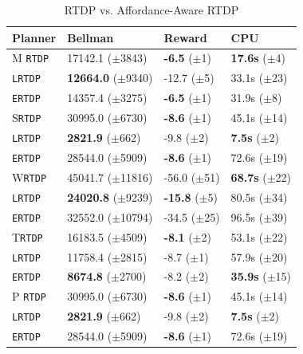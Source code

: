 \documentclass[letterpaper]{article}
\newcommand{\ra}[1]{\renewcommand{\arraystretch}{#1}} %
\begin{document}
\begin{table}
\ra{1.4}
\begin{tabular}{@{}llll@{}}\toprule
Planner & Bellman & Reward & CPU \\ \midrule
M \texttt{RTDP} & 17142.1 ($\pm$3843) 		& {\bf -6.5} ($\pm$1) 		& {\bf 17.6s}   ($\pm$4) \\
\texttt{LRTDP} 	& {\bf 12664.0} ($\pm$9340) 	& -12.7 ($\pm$5) 		& 33.1s   ($\pm$23) \\
\texttt{ERTDP} 	& 14357.4 ($\pm$3275) 		& {\bf -6.5}   ($\pm$1) 	& 31.9s   ($\pm$8) \\ \hline
S\texttt{RTDP} 	& 30995.0 ($\pm$6730) 		& {\bf -8.6}   ($\pm$1) 	& 45.1s   ($\pm$14) \\
\texttt{LRTDP} 	& {\bf 2821.9} 	 ($\pm$662) 	& -9.8   ($\pm$2) 		& {\bf 7.5s}  ($\pm$2) \\
\texttt{ERTDP} 	& 28544.0 ($\pm$5909) 		& {\bf -8.6}   ($\pm$1) 	& 72.6s   ($\pm$19) \\ \hline
W\texttt{RTDP} & 45041.7 ($\pm$11816) 		& -56.0   ($\pm$51) 		& {\bf 68.7s}   ($\pm$22) \\
\texttt{LRTDP} 	& {\bf 24020.8} ($\pm$9239) 	& {\bf -15.8}   ($\pm$5) 	& 80.5s   ($\pm$34) \\
\texttt{ERTDP} 	& 32552.0 ($\pm$10794) 		& -34.5   ($\pm$25) 		& 96.5s   ($\pm$39) \\ \hline
T\texttt{RTDP}  	& 16183.5 ($\pm$4509) 		& {\bf -8.1}   ($\pm$2) 	& 53.1s   ($\pm$22) \\
\texttt{LRTDP} 	& 11758.4 ($\pm$2815) 		& -8.7   ($\pm$1) 		& 57.9s   ($\pm$20) \\
\texttt{ERTDP} 	& {\bf 8674.8} 	($\pm$2700) 	& -8.2   ($\pm$2) 		& {\bf 35.9s}   ($\pm$15) \\ \hline
P \texttt{RTDP} & 30995.0 ($\pm$6730) 		& {\bf -8.6}   ($\pm$1) 	& 45.1s   ($\pm$14) \\
\texttt{LRTDP} 	& {\bf 2821.9} 	 ($\pm$662) 	& -9.8   ($\pm$2) 		& {\bf 7.5s}  ($\pm$2) \\
\texttt{ERTDP} 	& 28544.0 ($\pm$5909) 		& {\bf -8.6}   ($\pm$1) 	& 72.6s   ($\pm$19) \\
\bottomrule
\end{tabular}
\label{table:minecraft_results}
\caption{RTDP vs. Affordance-Aware RTDP}
\end{table}
\end{document}
